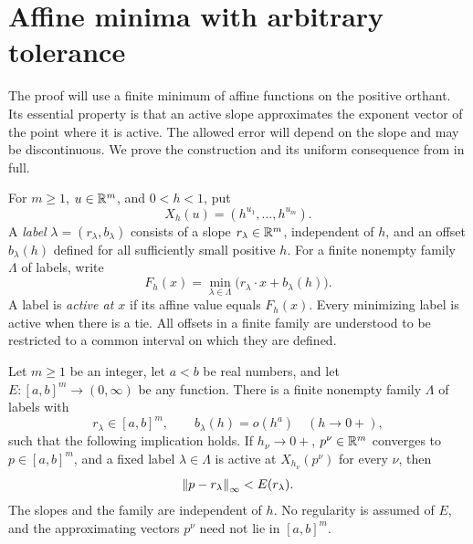 \section{Affine minima with arbitrary tolerance}
\label{sec:affine}

The proof will use a finite minimum of affine functions on the positive
orthant. Its essential property is that an active slope approximates the
exponent vector of the point where it is active. The allowed error will
depend on the slope and may be discontinuous. We prove the construction
and its uniform consequence from
\cite[Lemma~2.1 and Corollary~2.2]{OpenAI2026} in full.

For $m\geq1$, $u\in\mathbb R^m$, and $0<h<1$, put
\[
 X_h(u)=(h^{u_1},\ldots,h^{u_m}).
\]
A \emph{label} $\lambda=(r_\lambda,b_\lambda)$ consists of a slope
$r_\lambda\in\mathbb R^m$, independent of $h$, and an offset $b_\lambda(h)$
defined for all sufficiently small positive $h$. For a finite nonempty
family $\Lambda$ of labels, write
\[
 F_h(x)=\min_{\lambda\in\Lambda}
       \bigl(r_\lambda\cdot x+b_\lambda(h)\bigr).
\]
A label is \emph{active at $x$} if its affine value equals $F_h(x)$.
Every minimizing label is active when there is a tie. All offsets in a
finite family are understood to be restricted to a common interval on
which they are defined.

\begin{lemma}
\label{lem:affine}
Let $m\geq1$ be an integer, let $a<b$ be real numbers, and let
$E:[a,b]^m\to(0,\infty)$ be any function. There is a finite nonempty
family $\Lambda$ of labels with
\[
 r_\lambda\in[a,b]^m,
 \qquad b_\lambda(h)=o(h^a)\quad(h\to0+),
\]
such that the following implication holds. If $h_\nu\to0+$,
$p^\nu\in\mathbb R^m$ converges to $p\in[a,b]^m$, and a fixed label
$\lambda\in\Lambda$ is active at $X_{h_\nu}(p^\nu)$ for every $\nu$,
then
\[
 \left\|p-r_\lambda\right\|_\infty<E(r_\lambda).
\]
The slopes and the family are independent of $h$. No regularity is
assumed of $E$, and the approximating vectors $p^\nu$ need not lie in
$[a,b]^m$.
\end{lemma}

